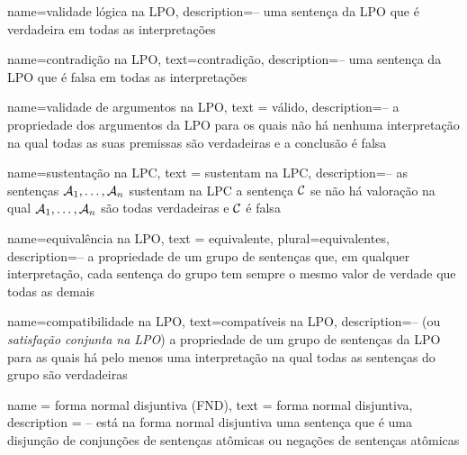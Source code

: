 


{
name=validade lógica na LPO,
description={-- uma sentença da LPO que é verdadeira em todas as interpretações}
}

{
  name=contradição na LPO,
  text=contradição,
description={--  uma sentença da LPO que é falsa em todas as interpretações}
} 

{
  name=validade de argumentos na LPO,
  text = válido,
description={-- a propriedade dos argumentos da LPO para os quais não há nenhuma interpretação na qual todas as suas premissas são verdadeiras e a conclusão é falsa}
}

{
  name=sustentação na LPC,
  text = sustentam na LPC,
description={-- as sentenças $\mathcal{A}_1, \ldots, \mathcal{A}_n$ sustentam na LPC a sentença $\mathcal{C}$ se não há valoração na qual $\mathcal{A}_1, \ldots, \mathcal{A}_n$ são todas verdadeiras e $\mathcal{C}$ é falsa}
}

{
  name=equivalência na LPO,
  text = equivalente,
  plural=equivalentes,
description={-- a propriedade de um grupo de sentenças que, em qualquer interpretação, cada sentença do grupo tem sempre o mesmo valor de verdade que todas as demais}
}

{
  name=compatibilidade na LPO,
  text=compatíveis na LPO,
description={-- (ou \textit{satisfação conjunta na LPO}) a propriedade de um grupo de sentenças da LPO para as quais há pelo menos uma interpretação na qual todas as sentenças do grupo são verdadeiras}
}

{
  name = forma normal disjuntiva (FND),
  text = forma normal disjuntiva,
  description = {-- está na forma normal disjuntiva uma sentença que é uma disjunção de conjunções de sentenças atômicas ou negações de sentenças atômicas}
}

